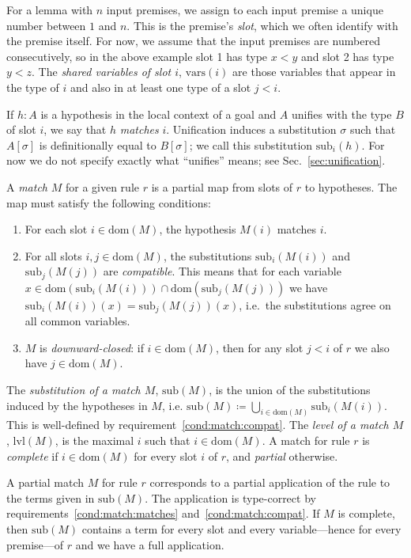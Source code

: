 \documentclass[runningheads]{llncs}
\newcommand{\vars}{\ensuremath{\mathrm{vars}}}
\newcommand{\dom}{\ensuremath{\mathrm{dom}}}
\newcommand{\sub}{\ensuremath{\mathrm{sub}}}
\newcommand{\lvl}{\ensuremath{\mathrm{lvl}}}
\begin{document}
For a lemma with $n$ input premises, we assign to each input premise a unique number between $1$ and $n$.
This is the premise's \emph{slot}, which we often identify with the premise itself.
For now, we assume that the input premises are numbered consecutively, so in the above example slot 1 has type $x < y$ and slot 2 has type $y < z$.
The \emph{shared variables of slot $i$}, $\vars(i)$ are those variables that appear in the type of $i$ and also in at least one type of a slot $j < i$.

If $h : A$ is a hypothesis in the local context of a goal and $A$ unifies with the type $B$ of slot $i$, we say that $h$ \emph{matches} $i$.
Unification induces a substitution $σ$ such that $A[σ]$ is definitionally equal to $B[σ]$; we call this substitution $\sub_{i}(h)$.
For now we do not specify exactly what \enquote{unifies} means; see Sec.~\ref{sec:unification}.

A \textit{match} $M$ for a given rule $r$ is a partial map from slots of $r$ to hypotheses.
The map must satisfy the following conditions:
\begin{enumerate}
  \item\label{cond:match:matches} For each slot $i ∈ \dom(M)$, the hypothesis $M(i)$ matches $i$.
  \item\label{cond:match:compat} For all slots $i,j ∈ \dom(M)$, the substitutions $\sub_{i}(M(i))$ and $\sub_{j}(M(j))$ are \emph{compatible}.
        This means that for each variable $x ∈ \dom(\sub_{i}(M(i))) ∩ \dom(\sub_{j}(M(j)))$ we have $\sub_{i}(M(i))(x) = \sub_{j}(M(j))(x)$, i.e.\ the substitutions agree on all common variables.
  \item\label{cond:match:closed} $M$ is \emph{downward-closed}: if $i ∈ \dom(M)$, then for any slot $j < i$ of $r$ we also have $j ∈ \dom(M)$.
\end{enumerate}
The \emph{substitution of a match $M$}, $\sub(M)$, is the union of the substitutions induced by the hypotheses in $M$, i.e. $\sub(M) ≔ ⋃_{i ∈ \dom(M)}\sub_{i}(M(i))$.
This is well-defined by requirement~\ref{cond:match:compat}.
The \textit{level of a match $M$}, $\lvl(M)$, is the maximal $i$ such that $i ∈ \dom(M)$.
A match for rule $r$ is \textit{complete} if $i ∈ \dom(M)$ for every slot $i$ of $r$, and \emph{partial} otherwise.

A partial match $M$ for rule $r$ corresponds to a partial application of the rule to the terms given in $\sub(M)$.
The application is type-correct by requirements~\ref{cond:match:matches} and~\ref{cond:match:compat}.
If $M$ is complete, then $\sub(M)$ contains a term for every slot and every variable---hence for every premise---of $r$ and we have a full application.
\end{document}
